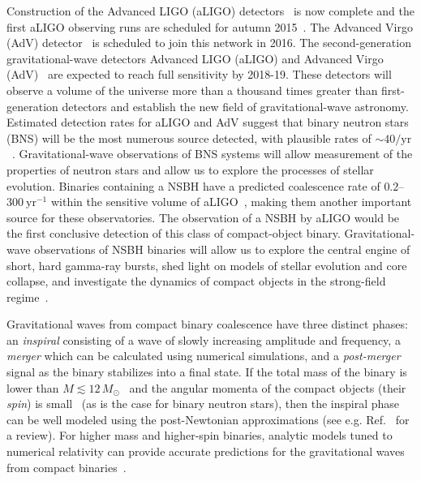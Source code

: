 Construction of the Advanced LIGO (aLIGO) detectors~\cite{TheLIGOScientific:2014jea} 
is now complete and the
first aLIGO observing runs are scheduled for autumn 2015~\cite{Aasi:2013wya}.
The Advanced Virgo (AdV) detector~\cite{Acernese:2015gua} is scheduled to join this network in 2016.
The second-generation gravitational-wave detectors Advanced LIGO (aLIGO) and
Advanced Virgo (AdV)~\cite{Harry:2010zz, aVirgo} are expected to reach full 
sensitivity by 2018-19. These detectors
will observe a volume of the universe more than a thousand times greater than
first-generation detectors and establish the new field of gravitational-wave
astronomy. Estimated detection rates for aLIGO and AdV suggest that binary
neutron stars (BNS) will be the most numerous source detected, with plausible
rates of $\sim 40/\mathrm{yr}$~\cite{Abadie:2010cf}.
Gravitational-wave
observations of BNS systems will allow measurement of the properties of
neutron stars and allow us to explore the processes of stellar evolution. 
Binaries containing a \ac{NSBH} have a predicted  
coalescence rate of $0.2$--$300\ \textrm{yr}^{-1}$ within the sensitive volume
of aLIGO~\cite{Abadie:2010cf}, making them another important source for these
observatories. The observation of a \ac{NSBH} by \ac{aLIGO} would be the first 
conclusive detection of this class of compact-object binary. Gravitational-wave observations of \ac{NSBH} binaries will allow us to explore the central engine of short,
hard gamma-ray bursts, shed light on models of stellar evolution and core
collapse, and investigate the dynamics of compact 
objects in the strong-field regime~\cite{lrr-2009-2, Eichler:1989ve, Narayan:1992iy, Paczynski:1991aq, Berger:2010qx, Fryer:2011cx, Hannam:2013uu}.

Gravitational waves from compact binary coalescence have three distinct
phases: an \emph{inspiral} consisting of a wave of slowly increasing amplitude
and frequency, a \emph{merger} which can be calculated using numerical
simulations, and a \emph{post-merger} signal as the binary stabilizes into a final
state. If the total mass of the binary is lower than $M \lesssim 12\,
M_\odot$~\cite{Buonanno:2009zt,Brown:2012nn}
and the angular momenta of the compact objects (their \emph{spin}) is
small~\cite{Nitz:2013mxa,Kumar:2015tha}
(as is the case for binary neutron stars), then the inspiral phase can be 
well modeled using the post-Newtonian approximations (see e.g.
Ref.~\cite{Blanchet:2013haa} for a review).  For higher mass and higher-spin
binaries, analytic models tuned to numerical relativity can provide accurate
predictions for the gravitational waves from compact 
binaries~\cite{Buonanno:1998gg,Pan:2009wj,Damour:2012ky,Taracchini:2013rva,Damour:2014sva}. 

